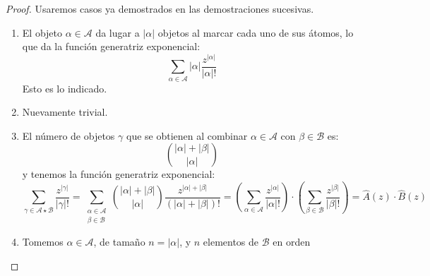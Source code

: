   \begin{proof}
    Usaremos casos ya demostrados en las demostraciones sucesivas.
    \begin{enumerate}
    \item %
      El objeto \(\alpha \in \mathscr{A}\)
      da lugar a \(\lvert \alpha \rvert\) objetos
      al marcar cada uno de sus átomos,
      lo que da la función generatriz exponencial:
      \begin{equation*}
        \sum_{\alpha \in \mathscr{A}}
          \lvert \alpha \rvert
            \frac{z^{\lvert \alpha \rvert}}{\lvert \alpha \rvert !}
      \end{equation*}
      Esto es lo indicado.
    \item %
      Nuevamente trivial.
    \item %
      El número de objetos \(\gamma\) que se obtienen
      al combinar \(\alpha \in \mathscr{A}\)
      con \(\beta \in \mathscr{B}\) es:
      \begin{equation*}
        \binom{\lvert \alpha \rvert + \lvert \beta \rvert}
              {\lvert \alpha \rvert}
      \end{equation*}
      y tenemos la función generatriz exponencial:
      \begin{equation*}
        \sum_{\gamma \in \mathscr{A} \star \mathscr{B}}
            \frac{z^{\lvert \gamma \rvert}}{\lvert \gamma \rvert !}
          = \sum_{\substack{
                     \alpha \in \mathscr{A} \\
                     \beta \in \mathscr{B}
                 }}
               \binom{\lvert \alpha \rvert + \lvert \beta \rvert}
                     {\lvert \alpha \rvert}
                  \frac{z^{\lvert \alpha \rvert
                            + \lvert \beta \rvert}}
                       {(\lvert \alpha \rvert
                            + \lvert \beta \rvert)!}
          = \left(
              \sum_{\alpha \in \mathscr{A}}
                \frac{z^{\lvert \alpha \rvert}}
                     {\lvert \alpha \rvert !}
            \right)
              \cdot \left(
                \sum_{\beta \in \mathscr{B}}
                  \frac{z^{\lvert \beta \rvert}}
                       {\lvert \beta \rvert !}
                    \right)
          = \widehat{A}(z) \cdot \widehat{B}(z)
      \end{equation*}
    \item %
      Tomemos \(\alpha \in \mathscr{A}\),
      de tamaño \(n = \lvert \alpha \rvert\),
      y \(n\) elementos de \(\mathscr{B}\) en orden

\end{enumerate}
\end{proof}
